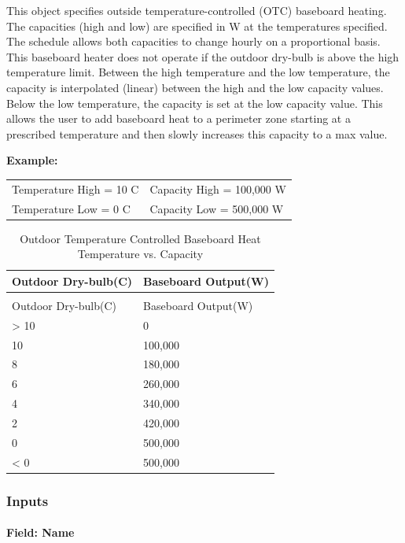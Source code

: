 This object specifies outside temperature-controlled (OTC) baseboard heating. The capacities (high and low) are specified in W at the temperatures specified. The schedule allows both capacities to change hourly on a proportional basis. This baseboard heater does not operate if the outdoor dry-bulb is above the high temperature limit. Between the high temperature and the low temperature, the capacity is interpolated (linear) between the high and the low capacity values. Below the low temperature, the capacity is set at the low capacity value. This allows the user to add baseboard heat to a perimeter zone starting at a prescribed temperature and then slowly increases this capacity to a max value.

\textbf{Example:}

\begin{center}
  \begin{tabular}{@{}ll@{}}
    Temperature High = 10 C & Capacity High = 100,000 W \\
    Temperature Low = 0 C & Capacity Low = 500,000 W
  \end{tabular}
\end{center}

\begin{longtable}[c]{@{}ll@{}}
\caption{Outdoor Temperature Controlled Baseboard Heat Temperature vs. Capacity \label{table:outdoor-temperature-controlled-baseboard-heat}} \tabularnewline
\toprule
Outdoor Dry-bulb(C) & Baseboard Output(W) \tabularnewline
\midrule
\endfirsthead

\caption[]{Outdoor Temperature Controlled Baseboard Heat Temperature vs. Capacity} \tabularnewline
\toprule
Outdoor Dry-bulb(C) & Baseboard Output(W) \tabularnewline
\midrule
\endhead

> 10 & 0 \tabularnewline
10 & 100,000 \tabularnewline
8 & 180,000 \tabularnewline
6 & 260,000 \tabularnewline
4 & 340,000 \tabularnewline
2 & 420,000 \tabularnewline
0 & 500,000 \tabularnewline
< 0 & 500,000 \tabularnewline
\bottomrule
\end{longtable}

\subsubsection{Inputs}\label{inputs-18-003}

\paragraph{Field: Name}\label{field-name-18-003}


